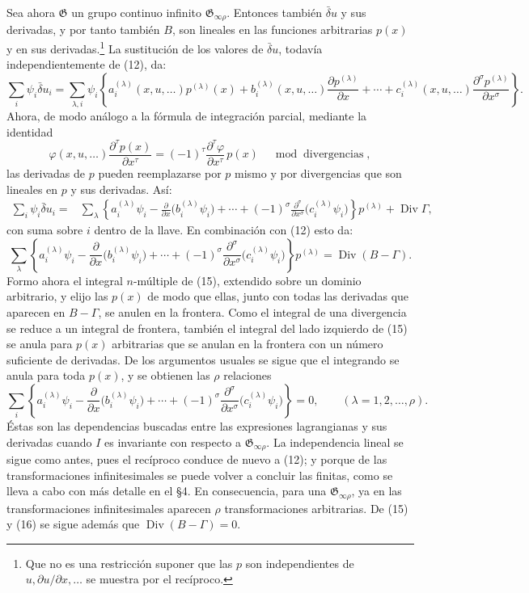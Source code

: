 \documentclass[11pt]{article}
\providecommand{\Div}{\operatorname{Div}}
\providecommand{\G}{\mathfrak G}
\providecommand{\bd}{\bar{\delta}}
\providecommand{\p}{\partial}
\begin{document}
Sea ahora \(\G\) un grupo continuo infinito \(\G_{\infty\rho}\). Entonces también \(\bd u\) y sus derivadas, y por tanto también \(B\), son lineales en las funciones arbitrarias \(p(x)\) y en sus derivadas.\footnote{Que no es una restricción suponer que las \(p\) son independientes de \(u,\p u/\p x,\ldots\) se muestra por el recíproco.} La sustitución de los valores de \(\bd u\), todavía independientemente de (12), da:
\[
\sum_i\psi_i\bd u_i
=\sum_{\lambda,i}\psi_i\left\{
a_i^{(\lambda)}(x,u,\ldots)p^{(\lambda)}(x)
+b_i^{(\lambda)}(x,u,\ldots)\frac{\p p^{(\lambda)}}{\p x}
+\cdots+c_i^{(\lambda)}(x,u,\ldots)
\frac{\p^\sigma p^{(\lambda)}}{\p x^\sigma}\right\}.
\]
Ahora, de modo análogo a la fórmula de integración parcial, mediante la identidad
\[
\varphi(x,u,\ldots)\frac{\p^\tau p(x)}{\p x^\tau}
=(-1)^\tau\frac{\p^\tau\varphi}{\p x^\tau}\,p(x)
\quad \bmod \text{ divergencias},
\]
las derivadas de \(p\) pueden reemplazarse por \(p\) mismo y por divergencias que son lineales en \(p\) y sus derivadas. Así:
\begin{equation}
\begin{aligned}
\sum_i\psi_i\bd u_i
={}&\sum_\lambda\left\{
a_i^{(\lambda)}\psi_i-\frac{\p}{\p x}\bigl(b_i^{(\lambda)}\psi_i\bigr)
+\cdots+(-1)^\sigma
\frac{\p^\sigma}{\p x^\sigma}\bigl(c_i^{(\lambda)}\psi_i\bigr)
\right\}p^{(\lambda)}+\Div\Gamma,
\end{aligned}
\tag{14}
\end{equation}
con suma sobre \(i\) dentro de la llave. En combinación con (12) esto da:
\begin{equation}
\sum_\lambda\left\{
a_i^{(\lambda)}\psi_i-\frac{\p}{\p x}\bigl(b_i^{(\lambda)}\psi_i\bigr)
+\cdots+(-1)^\sigma
\frac{\p^\sigma}{\p x^\sigma}\bigl(c_i^{(\lambda)}\psi_i\bigr)
\right\}p^{(\lambda)}
=\Div(B-\Gamma).
\tag{15}
\end{equation}
Formo ahora el integral \(n\)-múltiple de (15), extendido sobre un dominio arbitrario, y elijo las \(p(x)\) de modo que ellas, junto con todas las derivadas que aparecen en \(B-\Gamma\), se anulen en la frontera. Como el integral de una divergencia se reduce a un integral de frontera, también el integral del lado izquierdo de (15) se anula para \(p(x)\) arbitrarias que se anulan en la frontera con un número suficiente de derivadas. De los argumentos usuales se sigue que el integrando se anula para toda \(p(x)\), y se obtienen las \(\rho\) relaciones
\begin{equation}
\sum_i\left\{
a_i^{(\lambda)}\psi_i-\frac{\p}{\p x}\bigl(b_i^{(\lambda)}\psi_i\bigr)
+\cdots+(-1)^\sigma
\frac{\p^\sigma}{\p x^\sigma}\bigl(c_i^{(\lambda)}\psi_i\bigr)
\right\}=0,\qquad(\lambda=1,2,\ldots,\rho).
\tag{16}
\end{equation}
Éstas son las dependencias buscadas entre las expresiones lagrangianas y sus derivadas cuando \(I\) es invariante con respecto a \(\G_{\infty\rho}\). La independencia lineal se sigue como antes, pues el recíproco conduce de nuevo a (12); y porque de las transformaciones infinitesimales se puede volver a concluir las finitas, como se lleva a cabo con más detalle en el \S{}4. En consecuencia, para una \(\G_{\infty\rho}\), ya en las transformaciones infinitesimales aparecen \(\rho\) transformaciones arbitrarias. De (15) y (16) se sigue además que \(\Div(B-\Gamma)=0\).
\end{document}
